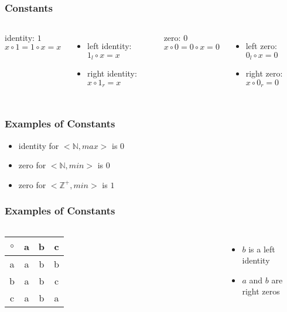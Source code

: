 \documentclass[dvipsnames]{beamer}
\begin{document}
\begin{frame}
  \frametitle{Constants}

  \begin{columns}
    \begin{definition}
      \alert{identity}: $1$\\
      $x \circ 1 = 1 \circ x = x$
    \end{definition}

    \begin{itemize}
      \item left identity: $1_l \circ x = x$
      \item right identity: $x \circ 1_r = x$
    \end{itemize}

    \pause
    \begin{definition}
      \alert{zero}: $0$\\
      $x \circ 0 = 0 \circ x = 0$
    \end{definition}

    \begin{itemize}
      \item left zero: $0_l \circ x = 0$
      \item right zero: $x \circ 0_r = 0$
    \end{itemize}
  \end{columns}
\end{frame}

\begin{frame}
  \frametitle{Examples of Constants}

  \begin{itemize}
    \item identity for $<\mathbb{N}, max>$ is $0$
    \item zero for $<\mathbb{N}, min>$ is $0$
    \item zero for $<\mathbb{Z}^+, min>$ is $1$
  \end{itemize}
\end{frame}

\begin{frame}
  \frametitle{Examples of Constants}

  \begin{columns}
    \begin{tabular}{c||c|c|c}
      $\circ$ & a & b & c\\\hline\hline
            a & a & b & b\\\hline
            b & a & b & c\\\hline
            c & a & b & a
    \end{tabular}

    \begin{itemize}
      \item $b$ is a left identity
      \item $a$ and $b$ are right zeros
    \end{itemize}
  \end{columns}
\end{frame}
\end{document}
